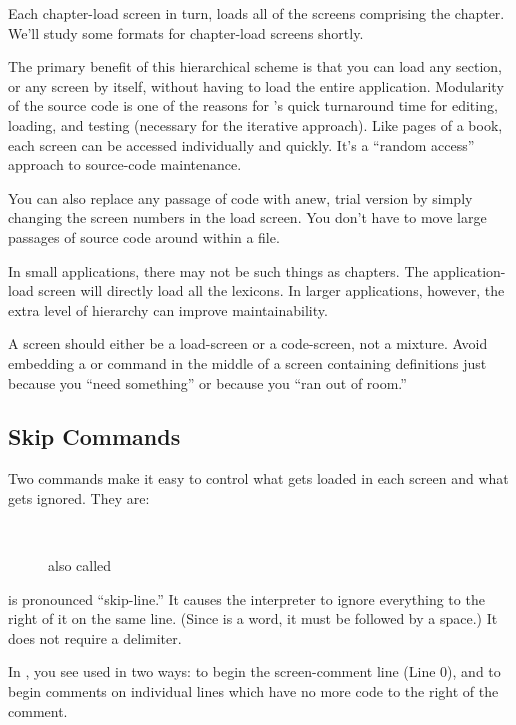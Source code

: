 Each chapter-load screen in turn, loads all of the screens comprising
the chapter.  We'll study some formats for chapter-load screens shortly.

The primary benefit of this hierarchical scheme is that you can load
any section, or any screen by itself, without having to load the
entire application.  Modularity of the source code is one of the
reasons for \Forth{}'s quick turnaround time for editing, loading, and
testing (necessary for the iterative approach).  Like pages of a book,
each screen can be accessed individually and quickly.  It's a ``random
access'' approach to source-code maintenance.

You can also replace any passage of code with anew, trial version by
simply changing the screen numbers in the load screen.  You don't have to
move large passages of source code around within a file.

In small applications, there may not be such things as chapters.  The
application-load screen will directly load all the lexicons.  In
larger applications, however, the extra level of hierarchy can improve
maintainability.

A screen should either be a load-screen or a code-screen, not a mixture.
Avoid embedding a  or  command in the middle of a
screen containing definitions just because you ``need something'' or
because you ``ran out of room.''

\subsection{Skip Commands}%
Two commands make it easy to control what gets loaded in each screen
and what gets ignored.  They are:

\medbreak
\begin{description}
\item[\emph{\forthb{\bs}}]~
\item[\emph{}] also called 
\end{description}
\forth{\bs} is pronounced ``skip-line.'' It causes the
\Forth{} interpreter to ignore everything to the right of it on the
same line. (Since \forth{\bs} is a \Forth{} word, it must be followed
by a space.) It does not require a delimiter.

In , you see \forth{\bs} used in two ways: to begin the
screen-comment line (Line 0), and to begin comments on individual
lines which have no more code to the right of the comment.

